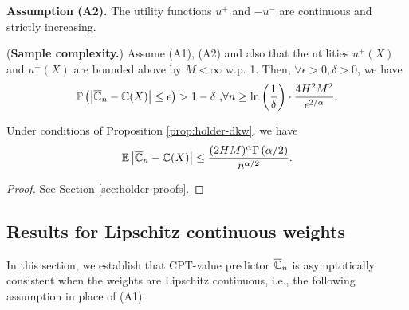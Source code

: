 \noindent\textbf{Assumption (A2).}  The utility functions $u^+$ and $-u^-$ are continuous and strictly increasing.


\begin{proposition}(\textbf{Sample complexity.})
\label{prop:holder-dkw}
Assume (A1), (A2) and also that the utilities $u^+(X)$ and $u^-(X)$ are bounded above by $M<\infty$ w.p. 1. Then, $\forall \epsilon >0, \delta >0$, we have
$$
\mathbb{P}\left( \left |\overline {\mathbb{C}}_n- \mathbb{C}(X) \right| \leq  \epsilon  \right) >1- \delta\text{     ,} \forall n \geq \ln\left(\frac{1}{\delta}\right)\cdot 
\frac{4H^2 M^2}{\epsilon^{2/\alpha}}.$$
\end{proposition}

\begin{corollary}
\label{cor:holder-dkw}
Under conditions of Proposition \ref{prop:holder-dkw}, we have
$$
\mathbb{E} \left|\overline {\mathbb{C}}_n- \mathbb{C}(X) \right|  \le    \frac{(2H M)^\alpha \Gamma\left(\alpha/2\right)}{n^{\alpha/2}}.$$
\end{corollary}

\begin{proof}
%
%
See Section \ref{sec:holder-proofs}.
\end{proof}

\subsection{Results for Lipschitz continuous weights}
In this section, we establish that CPT-value predictor $\overline {\mathbb{C}}_n$ is asymptotically consistent when the weights are Lipschitz continuous,  i.e., the following assumption in place of (A1):


